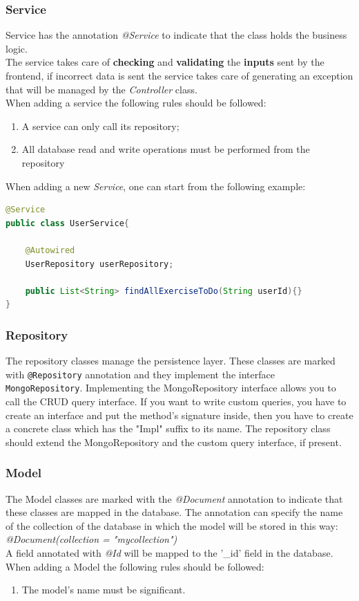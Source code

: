 \subsubsection{Service}
Service has the annotation \textit{@Service} to indicate that the class holds the business logic.\\
The service takes care of \textbf{checking} and \textbf{validating} the \textbf{inputs} sent by the frontend, if incorrect data is sent the service takes care of generating an exception that will be managed by the \textit{Controller} class.\\
When adding a service the following rules should be followed: 
\begin{enumerate}
\item A service can only call its repository;
\item All database read and write operations must be performed from the repository
\end{enumerate}
When adding a new \textit{Service}, one can start from the following example:
\begin{lstlisting}[language=Java]
@Service
public class UserService{

	@Autowired
	UserRepository userRepository; 
	
	public List<String> findAllExerciseToDo(String userId){} 
}
\end{lstlisting}

\subsubsection{Repository}
The repository classes manage the persistence layer. These classes are marked with \texttt{@Repository} annotation and they implement the interface \texttt{MongoRepository}. Implementing the MongoRepository interface allows you to call the CRUD query interface. 
If you want to write custom queries, you have to create an interface and put the method's signature inside, then you have to create a concrete class which has the "Impl" suffix to its name. The repository class should extend the MongoRepository and the custom query interface, if present. 
\subsubsection{Model}
The Model classes are marked with the \textit{@Document} annotation to indicate that these classes are mapped in the database. The annotation can specify the name of the collection of the database in which the model will be stored in this way:\\ \textit{@Document(collection = "mycollection")}\\
A field annotated with \textit{@Id} will be mapped to the '\_id' field in the database.\\
When adding a Model the following rules should be followed: 
\begin{enumerate}
\item The model's name must be significant.
\end{enumerate}

